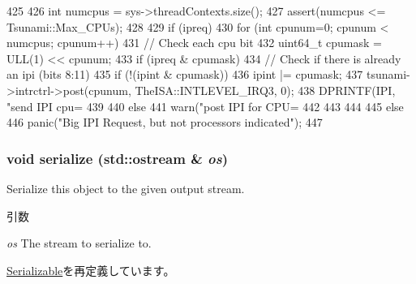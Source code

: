 \begin{DoxyCode}
425 {
426     int numcpus = sys->threadContexts.size();
427     assert(numcpus <= Tsunami::Max_CPUs);
428 
429     if (ipreq) {
430         for (int cpunum=0; cpunum < numcpus; cpunum++) {
431             // Check each cpu bit
432             uint64_t cpumask = ULL(1) << cpunum;
433             if (ipreq & cpumask) {
434                 // Check if there is already an ipi (bits 8:11)
435                 if (!(ipint & cpumask)) {
436                     ipint  |= cpumask;
437                     tsunami->intrctrl->post(cpunum, TheISA::INTLEVEL_IRQ3, 0);
438                     DPRINTF(IPI, "send IPI cpu=%
439                 }
440                 else
441                     warn("post IPI for CPU=%
442             }
443         }
444     }
445     else
446         panic("Big IPI Request, but not processors indicated\n");
447 }
\end{DoxyCode}
\hypertarget{classTsunamiCChip_a53e036786d17361be4c7320d39c99b84}{
\subsubsection[{serialize}]{\setlength{\rightskip}{0pt plus 5cm}void serialize (std::ostream \& {\em os})}}
\label{classTsunamiCChip_a53e036786d17361be4c7320d39c99b84}
Serialize this object to the given output stream. 
\begin{DoxyParams}{引数}
\item[{\em os}]The stream to serialize to. \end{DoxyParams}


\hyperlink{classSerializable_ad6272f80ae37e8331e3969b3f072a801}{Serializable}を再定義しています。



